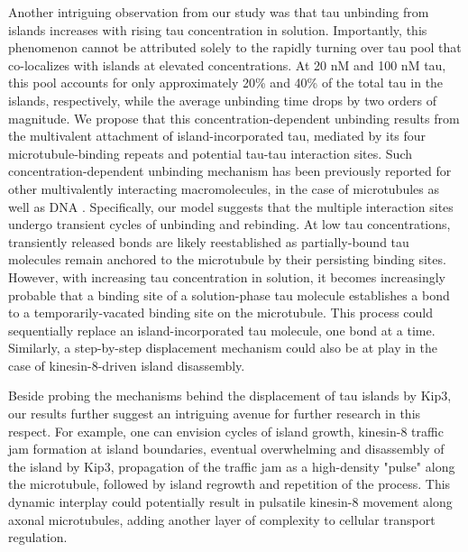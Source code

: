 Another intriguing observation from our study was that tau unbinding from islands increases with rising tau concentration in solution. Importantly, this phenomenon cannot be attributed solely to the rapidly turning over tau pool that co-localizes with islands at elevated concentrations. At 20 nM and 100 nM tau, this pool accounts for only approximately 20\% and 40\% of the total tau in the islands, respectively, while the average unbinding time drops by two orders of magnitude. We propose that this concentration-dependent unbinding results from the multivalent attachment of island-incorporated tau, mediated by its four microtubule-binding repeats and potential tau-tau interaction sites. Such concentration-dependent unbinding mechanism has been previously reported for other multivalently interacting macromolecules, in the case of microtubules as well as DNA \parencite{lanskydiffusible2015, sing2014multiple}. Specifically, our model suggests that the multiple interaction sites undergo transient cycles of unbinding and rebinding. At low tau concentrations, transiently released bonds are likely reestablished as partially-bound tau molecules remain anchored to the microtubule by their persisting binding sites. However, with increasing tau concentration in solution, it becomes increasingly probable that a binding site of a solution-phase tau molecule establishes a bond to a temporarily-vacated binding site on the microtubule. This process could sequentially replace an island-incorporated tau molecule, one bond at a time. Similarly, a step-by-step displacement mechanism could also be at play in the case of kinesin-8-driven island disassembly.\par

Beside probing the mechanisms behind the displacement of tau islands by Kip3, our results further suggest an intriguing avenue for further research in this respect. For example, one can envision cycles of island growth, kinesin-8 traffic jam formation at island boundaries, eventual overwhelming and disassembly of the island by Kip3, propagation of the traffic jam as a high-density "pulse" along the microtubule, followed by island regrowth and repetition of the process. This dynamic interplay could potentially result in pulsatile kinesin-8 movement along axonal microtubules, adding another layer of complexity to cellular transport regulation.\par


